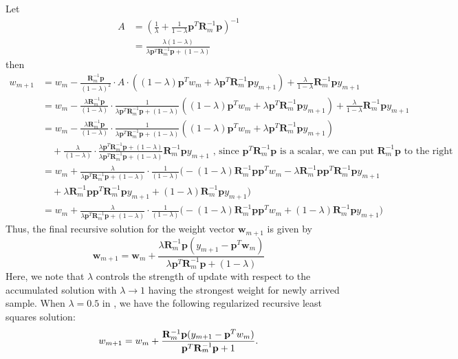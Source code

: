 Let 
\begin{align*}
	A &= \left( \frac{1}{\lambda} + \frac{1}{1 - \lambda} \mathbf{p}^T \mathbf{R}_m^{-1} \mathbf{p} \right)^{-1} \\
	  &= \frac{\lambda(1-\lambda)}{\lambda \mathbf{p}^T \mathbf{R}_m^{-1} \mathbf{p}+(1-\lambda)}
\end{align*}
then 
\begin{align*}
	w_{m+1} &= w_m - \frac{\mathbf{R}_m^{-1} \mathbf{p}}{(1-\lambda)^2} \cdot A \cdot \left((1-\lambda)\mathbf{p}^T w_m + \lambda \mathbf{p}^T \mathbf{R}_m^{-1}\mathbf{p} y_{m+1}\right)+ \frac{\lambda}{1 - \lambda} \mathbf{R}_m^{-1} \mathbf{p} y_{m+1}\\
			&= w_m - \frac{\lambda \mathbf{R}_m^{-1} \mathbf{p}}{(1-\lambda)} \cdot \frac{1}{\lambda \mathbf{p}^T \mathbf{R}_m^{-1} \mathbf{p}+(1-\lambda)}\left((1-\lambda)\mathbf{p}^T w_m + \lambda \mathbf{p}^T \mathbf{R}_m^{-1}\mathbf{p} y_{m+1}\right) + \frac{\lambda}{1 - \lambda} \mathbf{R}_m^{-1} \mathbf{p} y_{m+1}\\
			&= w_m - \frac{\lambda \mathbf{R}_m^{-1} \mathbf{p}}{(1-\lambda)} \cdot \frac{1}{\lambda \mathbf{p}^T \mathbf{R}_m^{-1} \mathbf{p}+(1-\lambda)}\left((1-\lambda)\mathbf{p}^T w_m + \lambda \mathbf{p}^T \mathbf{R}_m^{-1}\mathbf{p} y_{m+1}\right) \\ 
			&\quad +\frac{\lambda}{(1 - \lambda)}\cdot \frac{\lambda \mathbf{p}^T \mathbf{R}_m^{-1} \mathbf{p}+(1-\lambda)}{\lambda \mathbf{p}^T \mathbf{R}_m^{-1} \mathbf{p}+(1-\lambda)} \mathbf{R}_m^{-1} \mathbf{p} y_{m+1} \,\, \text{, since $\mathbf{p}^T \mathbf{R}_m^{-1} \mathbf{p}$ is a scalar, we can put $\mathbf{R}_m^{-1} \mathbf{p}$ to the right}\\
			&= w_m + \frac{\lambda}{\lambda \mathbf{p}^T \mathbf{R}_m^{-1} \mathbf{p}+(1-\lambda)}\cdot\frac{1}{(1-\lambda)}\big(-(1-\lambda)\mathbf{R}_m^{-1}\mathbf{p}\mathbf{p}^T w_m - \lambda \mathbf{R}_m^{-1}\mathbf{p}\mathbf{p}^T\mathbf{R}_m^{-1}\mathbf{p}y_{m+1}\\
			&\quad + \lambda \mathbf{R}_m^{-1}\mathbf{p}\mathbf{p}^T\mathbf{R}_m^{-1}\mathbf{p}y_{m+1} + (1-\lambda)\mathbf{R}_m^{-1}\mathbf{p}y_{m+1}\big)\\
			&= w_m + \frac{\lambda}{\lambda \mathbf{p}^T \mathbf{R}_m^{-1} \mathbf{p}+(1-\lambda)}\cdot\frac{1}{(1-\lambda)}\big(-(1-\lambda)\mathbf{R}_m^{-1}\mathbf{p}\mathbf{p}^T w_m + (1-\lambda)\mathbf{R}_m^{-1}\mathbf{p}y_{m+1}\big)
\end{align*}
Thus, the final recursive solution for the weight vector \(\mathbf{w}_{m+1}\) is given by
\[
\mathbf{w}_{m+1} = \mathbf{w}_m + \frac{\lambda \mathbf{R}_m^{-1} \mathbf{p} (y_{m+1} - \mathbf{p}^T \mathbf{w}_m)}{\lambda \mathbf{p}^T \mathbf{R}_m^{-1} \mathbf{p} + (1 - \lambda)}
\]
Here, we note that $\lambda$ controls the strength of update with respect to the accumulated solution with $\lambda \to 1$ having the strongest weight for newly arrived sample. When $\lambda = 0.5$ in , we have the following regularized recursive least squares solution:
\begin{align*}
	w_{m+1} = w_m + \frac{\mathbf{R}_m^{-1} {\mathbf{p}} (y_{m+1} - {\mathbf{p}}^T w_m)}{{\mathbf{p}}^T \mathbf{R}_m^{-1} {\mathbf{p}} + 1}. 
\end{align*}

